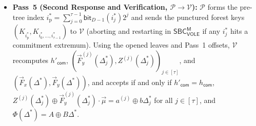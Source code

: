 \documentclass[11pt,a4paper]{article}
\theoremstyle{definition}
\theoremstyle{remark}
\newcommand{\SBCVOLEM}{\mathsf{SBC}_{\mathsf{VOLE}}^{\mathsf{M}}}
\newcommand{\com}{\mathsf{com}}
\begin{document}
\begin{itemize}[leftmargin=2em, itemsep=2.5pt]
    \item \textbf{Pass~5 (Second Response and Verification, $\mathcal{P} \to \mathcal{V}$):} $\mathcal{P}$ forms the pre-tree index $i^*_{\text{p}} = \sum_{j=0}^{\tau-1} \mathsf{bit}_{D-1}(i^*_j) 2^j$ and sends the punctured forest keys $(K_{i^*_{\text{p}}}, K_{i^*_0, \dots, i^*_{\tau-1}})$ to $\mathcal{V}$ (aborting and restarting in $\SBCVOLEM$ if any $i^*_j$ hits a commitment extremum). Using the opened leaves and Pass~1 offsets, $\mathcal{V}$ recomputes $h'_{\com}$, $(\vec{F}_y^{(j)}(\Delta^*_j), Z^{(j)}(\Delta^*_j))_{j \in [\tau]}$, and $(\vec{F}_x(\Delta^*), \vec{F}_y(\Delta^*))$, and accepts if and only if $h'_{\com} = h_{\com}$, $Z^{(j)}(\Delta^*_j) \oplus \vec{F}_y^{(j)}(\Delta^*_j) \cdot \vec{\mu} = a^{(j)} \oplus b\Delta^*_j$ for all $j \in [\tau]$, and $\Phi(\Delta^*) = A \oplus B\Delta^*$.
\end{itemize}
\end{document}
